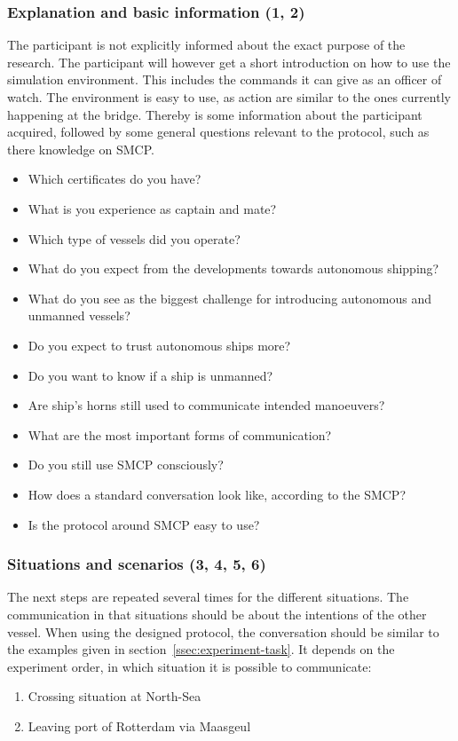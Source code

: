 \subsubsection{Explanation and basic information (1, 2)}
The participant is not explicitly informed about the exact purpose of the research. The participant will however get a short introduction on how to use the simulation environment. This includes the commands it can give as an officer of watch. The environment is easy to use, as action are similar to the ones currently happening at the bridge. Thereby is some information about the participant acquired, followed by some general questions relevant to the protocol, such as there knowledge on \acf{SMCP}.
\begin{spacing}{1}
\begin{itemize}
	\item Which certificates do you have?
	\item What is you experience as captain and mate?
	\item Which type of vessels did you operate?
	\item What do you expect from the developments towards autonomous shipping?
	\item What do you see as the biggest challenge for introducing autonomous and unmanned vessels?
	\item Do you expect to trust autonomous ships more?
	\item Do you want to know if a ship is unmanned?
	\item Are ship's horns still used to communicate intended manoeuvers?
	\item What are the most important forms of communication?
	\item Do you still use \ac{SMCP} consciously?
	\item How does a standard conversation look like, according to the \ac{SMCP}?
	\item Is the protocol around \ac{SMCP} easy to use?
\end{itemize}
\end{spacing}

\subsubsection{Situations and scenarios (3, 4, 5, 6)}
The next steps are repeated several times for the different situations. The communication in that situations should be about the intentions of the other vessel. When using the designed protocol, the conversation should be similar to the examples given in section~\ref{ssec:experiment-task}. It depends on the experiment order, in which situation it is possible to communicate:
\begin{spacing}{1}
\begin{enumerate}
	\item Crossing situation at North-Sea
	\item Leaving port of Rotterdam via Maasgeul
\end{enumerate}
\end{spacing}

